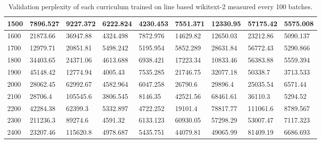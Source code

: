 \documentclass [11pt, proquest] {uwthesis}[2020/12/20]
\begin{document}
\begin{table}
\begin{tiny}
\begin{tabular}{|l|l|l|l|l|l|l|l|l|}
1500 & 7896.527 & 9227.372 & 6222.824 & 4230.453 & 7551.371 & 12330.95 & 57175.42 & 5575.008 \\ \hline
1600 & 21873.66 & 36947.88 & 4324.498 & 7872.976 & 14629.82 & 12650.03 & 23212.86 & 5090.137 \\ \hline
1700 & 12979.71 & 20851.81 & 5498.242 & 5195.954 & 5852.289 & 28631.84 & 56772.43 & 5290.866 \\ \hline
1800 & 34403.65 & 24371.06 & 4613.688 & 6938.421 & 17223.34 & 10833.46 & 56383.88 & 5559.394 \\ \hline
1900 & 45148.42 & 12774.94 & 4005.43 & 7535.285 & 21746.75 & 32077.18 & 50338.7 & 3713.533 \\ \hline
2000 & 28062.45 & 62992.67 & 4582.964 & 6047.258 & 26790.6 & 29896.4 & 25035.54 & 6571.44 \\ \hline
2100 & 28706.4 & 105545.6 & 3806.545 & 8146.35 & 42521.56 & 68461.61 & 36110.3 & 5294.52 \\ \hline
2200 & 42284.38 & 62399.3 & 5332.897 & 4722.252 & 19101.4 & 78817.77 & 111061.6 & 8789.567 \\ \hline
2300 & 211236.3 & 89274.6 & 4591.32 & 6133.123 & 60930.05 & 57298.29 & 53007.47 & 7117.323 \\ \hline
2400 & 23207.46 & 115620.8 & 4978.687 & 5435.751 & 44079.81 & 49065.99 & 81409.19 & 6686.693 \\ \hline
\end{tabular}
\caption{Validation perplexity of each curriculum trained on line based wikitext-2 measured every 100 batches.}
\label{tab:wikitext2-line-perplexity}
\end{tiny}
\end{table}
\end{document}
